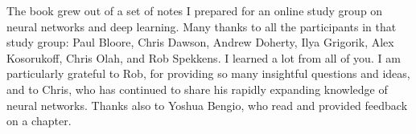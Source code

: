 
The book grew out of a set of notes I prepared for an online study group on neural networks and deep learning. Many thanks to all the participants in that study group: Paul Bloore, Chris Dawson, Andrew Doherty, Ilya Grigorik, Alex Kosorukoff, Chris Olah, and Rob Spekkens. I learned a lot from all of you. I am particularly grateful to Rob, for providing so many insightful questions and ideas, and to Chris, who has continued to share his rapidly expanding knowledge of neural networks. Thanks also to Yoshua Bengio, who read and provided feedback on a chapter.
